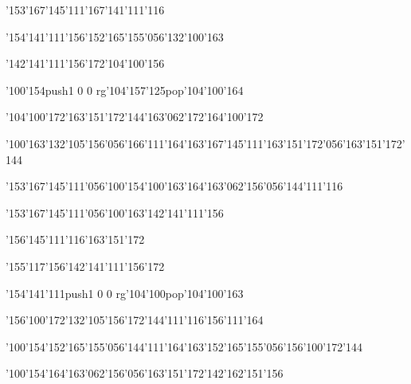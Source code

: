 \null\vfill\ipa\centerline{\enskip\enskip\enskip\enskip\char'153\char'167\char'145\char'111\enskip\enskip\enskip\enskip\char'167\char'141\char'111\char'116\enskip\enskip\enskip\enskip}\medskip\centerline{\enskip\enskip\enskip\enskip\char'154\char'141\char'111\char'156\enskip\char'152\char'165\char'155\char'056\char'132\char'100\char'163}\medskip\centerline{\enskip\enskip\enskip\enskip\enskip\enskip\char'142\char'141\char'111\char'156\char'172\enskip\enskip\enskip\enskip\char'104\char'100\char'156}\medskip\centerline{\enskip\char'100\char'154\enskip\pdfcolorstack\match push{1 0 0 rg}\char'104\char'157\char'125\pdfcolorstack\match pop{}\enskip\enskip\enskip\enskip\char'104\char'100\char'164}\medskip\centerline{\enskip\char'104\char'100\char'172\enskip\char'163\char'151\char'172\char'144\enskip\enskip\char'163\char'062\char'172\enskip\enskip\enskip\enskip\enskip\enskip\enskip\char'164\char'100\char'172}\medskip\centerline{\enskip\char'100\char'163\enskip\char'132\char'105\char'156\char'056\char'166\char'111\char'164\char'163\enskip\char'167\char'145\char'111\enskip\char'163\char'151\char'172\char'056\char'163\char'151\char'172\char'144}\medskip\centerline{\enskip\char'153\char'167\char'145\char'111\char'056\char'100\char'154\enskip\char'100\char'163\enskip\enskip\enskip\char'164\char'163\char'062\char'156\char'056\char'144\char'111\char'116\enskip\enskip\enskip\enskip\enskip}\medskip\vfill\footline{\hfil\tt\folio\hfil}\eject
\null\vfill\ipa\centerline{\enskip\enskip\enskip\enskip\char'153\char'167\char'145\char'111\char'056\char'100\char'163\enskip\char'142\char'141\char'111\char'156\enskip\enskip\enskip\enskip}\medskip\centerline{\enskip\enskip\enskip\enskip\char'156\char'145\char'111\char'116\enskip\char'163\char'151\char'172\enskip\enskip\enskip\enskip}\medskip\centerline{\enskip\enskip\char'155\char'117\char'156\enskip\enskip\char'142\char'141\char'111\char'156\char'172\enskip\enskip\enskip\enskip\enskip\enskip\enskip}\medskip\centerline{\enskip\enskip\enskip\enskip\char'154\char'141\char'111\enskip\pdfcolorstack\match push{1 0 0 rg}\char'104\char'100\pdfcolorstack\match pop{}\enskip\char'104\char'100\char'163}\medskip\centerline{\enskip\char'156\char'100\char'172\enskip\char'132\char'105\char'156\char'172\enskip\enskip\char'144\char'111\char'116\enskip\enskip\enskip\enskip\enskip\enskip\enskip\char'156\char'111\char'164}\medskip\centerline{\enskip\char'100\char'154\enskip\char'152\char'165\char'155\char'056\char'144\char'111\char'164\char'163\enskip\enskip\enskip\enskip\enskip\char'152\char'165\char'155\char'056\char'156\char'100\char'172\char'144}\medskip\centerline{\enskip\enskip\enskip\enskip\enskip\enskip\enskip\enskip\char'100\char'154\enskip\enskip\enskip\char'164\char'163\char'062\char'156\char'056\char'163\char'151\char'172\enskip\char'142\char'162\char'151\char'156}\medskip\vfill\footline{\hfil\tt\folio\hfil}\eject
